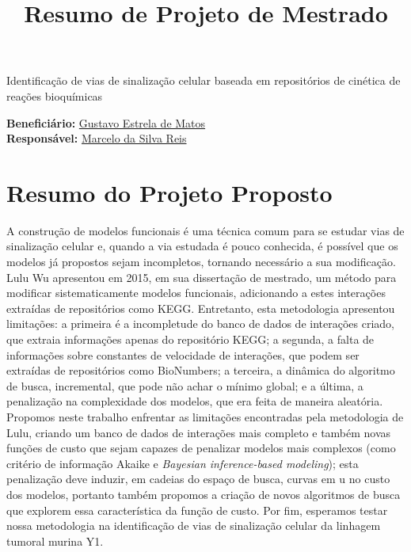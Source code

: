 \documentclass[12pt]{article}
\title{Resumo de Projeto de Mestrado}
\begin{document}
\doublespacing
\begin{flushleft}
{\LARGE Identificação de vias de sinalização celular baseada em repositórios de cinética de reações bioquímicas}

\bigskip
{\large {\bf Beneficiário:} \href{mailto:gustavo.estrela.matos@usp.br}{Gustavo Estrela de Matos}\\ 
        {\bf Responsável:} \href{mailto:marcelo.reis@butantan.gov.br}{Marcelo da Silva Reis}}\\
\end{flushleft}



\section*{Resumo do Projeto Proposto}
A construção de modelos funcionais é uma técnica comum para se 
estudar vias de sinalização celular e, quando a via estudada é pouco
conhecida, é possível que os modelos já propostos sejam incompletos, 
tornando necessário a sua modificação.
Lulu Wu apresentou em 2015, em sua dissertação de mestrado, um método 
para  modificar sistematicamente modelos funcionais, adicionando a estes
interações extraídas de repositórios como KEGG. Entretanto, esta 
metodologia apresentou limitações: a primeira é a incompletude do banco 
de dados de interações criado, que extraia informações apenas do 
repositório KEGG; a segunda, a falta de informações sobre constantes 
de velocidade de interações, que podem ser extraídas de repositórios 
como BioNumbers; a terceira, a dinâmica do algoritmo de busca, 
incremental, que pode não achar o mínimo global; e a última, a 
penalização na complexidade dos modelos, que era feita de maneira 
aleatória. Propomos neste trabalho enfrentar as limitações encontradas
pela metodologia de Lulu, criando um banco de dados de interações mais
completo e também novas funções de custo que sejam capazes de 
penalizar modelos mais complexos (como critério de informação Akaike e 
{\em Bayesian inference-based modeling}); esta penalização deve induzir,
em cadeias do  espaço de busca, curvas em u no custo dos modelos, 
portanto também propomos a criação de novos algoritmos de busca que 
explorem essa característica da função de custo. Por fim, esperamos 
testar nossa metodologia na identificação de vias de sinalização celular 
da linhagem tumoral murina Y1.
\end{document}
